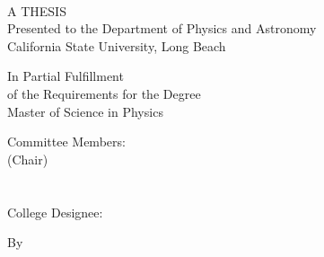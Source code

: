 \begin{titlepage}
    \begin{center}
        \linespread{2}
        \normalsize
        \textbf{ \cThesisTitle }\\
        \medskip
    \end{center}
    \begin{center}
        \linespread{1}
        \vfill

        A THESIS \\
        \bigskip
		Presented to the Department of Physics and Astronomy\\
        \bigskip
        California State University, Long Beach
        
        \vfill
        
        In Partial Fulfillment\\
        \bigskip
        of the Requirements for the Degree\\
        \bigskip
        Master of Science in Physics
        
        \vfill
        
        Committee Members:\\
        \bigskip
        \cCommitteeA (Chair)\\
        \cCommitteeB \\
        \cCommitteeC \\
        \bigskip
        College Designee:\\
        \bigskip
        \cDeptChair
        
        \vfill
        
        By \cAuthorName\\
        \bigskip
        \cLastDegree \\
       
        \bigskip
		\cGraduationDate
    \end{center}
\end{titlepage}